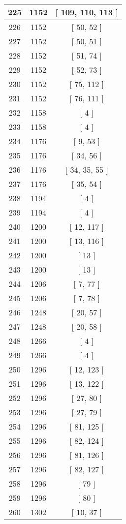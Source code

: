 \begin{center}
\begin{longtable}[H]{|| c c c ||}
\\\hline
225 & 1152 & [ 109, 110, 113 ]
\\\hline
226 & 1152 & [ 50, 52 ]
\\\hline
227 & 1152 & [ 50, 51 ]
\\\hline
228 & 1152 & [ 51, 74 ]
\\\hline
229 & 1152 & [ 52, 73 ]
\\\hline
230 & 1152 & [ 75, 112 ]
\\\hline
231 & 1152 & [ 76, 111 ]
\\\hline
232 & 1158 & [ 4 ]
\\\hline
233 & 1158 & [ 4 ]
\\\hline
234 & 1176 & [ 9, 53 ]
\\\hline
235 & 1176 & [ 34, 56 ]
\\\hline
236 & 1176 & [ 34, 35, 55 ]
\\\hline
237 & 1176 & [ 35, 54 ]
\\\hline
238 & 1194 & [ 4 ]
\\\hline
239 & 1194 & [ 4 ]
\\\hline
240 & 1200 & [ 12, 117 ]
\\\hline
241 & 1200 & [ 13, 116 ]
\\\hline
242 & 1200 & [ 13 ]
\\\hline
243 & 1200 & [ 13 ]
\\\hline
244 & 1206 & [ 7, 77 ]
\\\hline
245 & 1206 & [ 7, 78 ]
\\\hline
246 & 1248 & [ 20, 57 ]
\\\hline
247 & 1248 & [ 20, 58 ]
\\\hline
248 & 1266 & [ 4 ]
\\\hline
249 & 1266 & [ 4 ]
\\\hline
250 & 1296 & [ 12, 123 ]
\\\hline
251 & 1296 & [ 13, 122 ]
\\\hline
252 & 1296 & [ 27, 80 ]
\\\hline
253 & 1296 & [ 27, 79 ]
\\\hline
254 & 1296 & [ 81, 125 ]
\\\hline
255 & 1296 & [ 82, 124 ]
\\\hline
256 & 1296 & [ 81, 126 ]
\\\hline
257 & 1296 & [ 82, 127 ]
\\\hline
258 & 1296 & [ 79 ]
\\\hline
259 & 1296 & [ 80 ]
\\\hline
260 & 1302 & [ 10, 37 ]

\end{longtable}
\end{center}

